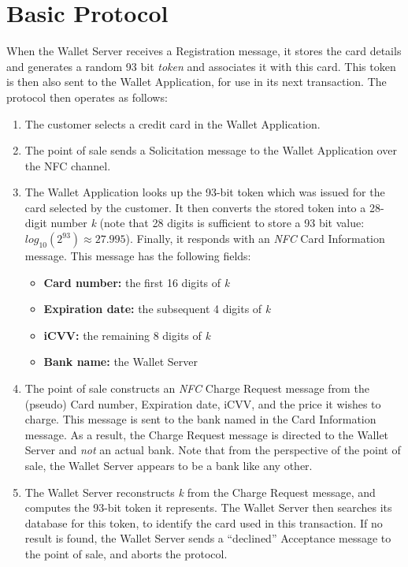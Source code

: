 \section{Basic Protocol}
\label{unlinkable-design-1}

When the Wallet Server receives a Registration message, it stores the card details and generates a random 93 bit \emph{token} and associates it with this card.
This token is then also sent to the Wallet Application, for use in its next transaction.
The protocol then operates as follows:
\begin{enumerate}
\item The customer selects a credit card in the Wallet Application.
\item The point of sale sends a Solicitation message to the Wallet Application over the NFC channel.
\item The Wallet Application looks up the 93-bit token which was issued for the card selected by the customer.
    It then converts the stored token into a 28-digit number \emph{k}
    (note that 28 digits is sufficient to store a 93 bit value: $log_{10}(2^{93}) \approx 27.995$).
    Finally, it responds with an \emph{NFC} Card Information message.
    This message has the following fields:
    \begin{itemize}
    \item \textbf{Card number:} the first 16 digits of \emph{k}
    \item \textbf{Expiration date:} the subsequent 4 digits of \emph{k}
    \item \textbf{iCVV:} the remaining 8 digits of \emph{k}
    \item \textbf{Bank name:} the Wallet Server
   	\end{itemize}
\item The point of sale constructs an \emph{NFC} Charge Request message from the (pseudo) Card number, Expiration date, iCVV, and the price it wishes to charge.
    This message is sent to the bank named in the Card Information message.
    As a result, the Charge Request message is directed to the Wallet Server and \emph{not} an actual bank.
    Note that from the perspective of the point of sale, the Wallet Server appears to be a bank like any other.
\item The Wallet Server reconstructs \emph{k} from the Charge Request message, and computes the 93-bit token it represents.
    The Wallet Server then searches its database for this token, to identify the card used in this transaction.
    If no result is found, the Wallet Server sends a ``declined'' Acceptance message to the point of sale, and aborts the protocol.

\end{enumerate}
